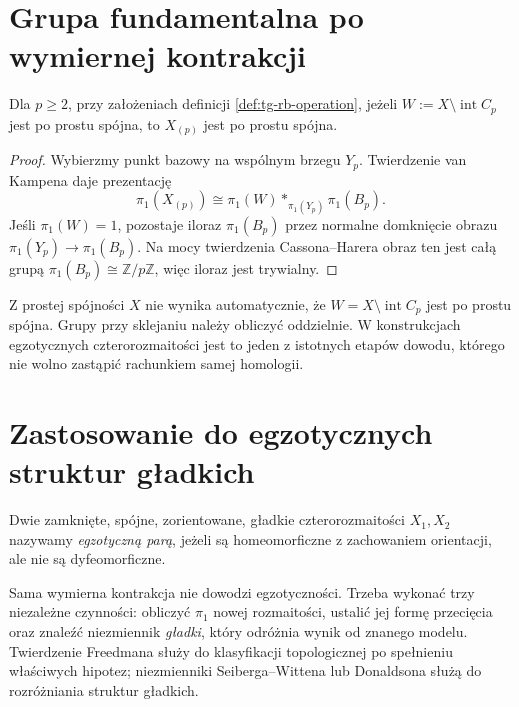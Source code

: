 \section{Grupa fundamentalna po wymiernej kontrakcji}
\label{sec:tg-rb-pi1}

\begin{stwierdzenie}
\label{prop:tg-rb-pi1}
Dla $p\geq2$, przy założeniach definicji
\ref{def:tg-rb-operation},
jeżeli $W:=X\setminus\operatorname{int}C_p$ jest
po prostu spójna, to $X_{(p)}$ jest po prostu spójna.
\end{stwierdzenie}

\begin{proof}
Wybierzmy punkt bazowy na wspólnym brzegu $Y_p$.
Twierdzenie van Kampena daje prezentację
\[
\pi_1(X_{(p)})\cong\pi_1(W)*_{\pi_1(Y_p)}\pi_1(B_p).
\]
Jeśli $\pi_1(W)=1$, pozostaje iloraz
$\pi_1(B_p)$ przez normalne domknięcie obrazu
$\pi_1(Y_p)\to\pi_1(B_p)$. Na mocy twierdzenia
Cassona--Harera obraz ten jest całą grupą
$\pi_1(B_p)\cong\mathbb Z/p\mathbb Z$,
więc iloraz jest trywialny.
\end{proof}

\begin{uwaga}[Dlaczego $\pi_1(X)=1$ nie wystarcza w dowodzie]
Z prostej spójności $X$ nie wynika automatycznie,
że $W=X\setminus\operatorname{int}C_p$ jest po prostu
spójna. Grupy przy sklejaniu należy obliczyć oddzielnie.
W konstrukcjach egzotycznych czterorozmaitości
jest to jeden z istotnych etapów dowodu, którego
nie wolno zastąpić rachunkiem samej homologii.
\end{uwaga}

\section{Zastosowanie do egzotycznych struktur gładkich}
\label{sec:tg-rb-exotic}

\begin{definicja}
Dwie zamknięte, spójne, zorientowane, gładkie
czterorozmaitości $X_1,X_2$ nazywamy
\emph{egzotyczną parą}, jeżeli są homeomorficzne
z zachowaniem orientacji, ale nie są dyfeomorficzne.
\end{definicja}

Sama wymierna kontrakcja nie dowodzi egzotyczności.
Trzeba wykonać trzy niezależne czynności:
obliczyć $\pi_1$ nowej rozmaitości, ustalić
jej formę przecięcia oraz znaleźć niezmiennik
\emph{gładki}, który odróżnia wynik od znanego modelu.
Twierdzenie Freedmana służy do klasyfikacji
topologicznej po spełnieniu właściwych hipotez;
niezmienniki Seiberga--Wittena lub Donaldsona
służą do rozróżniania struktur gładkich.

